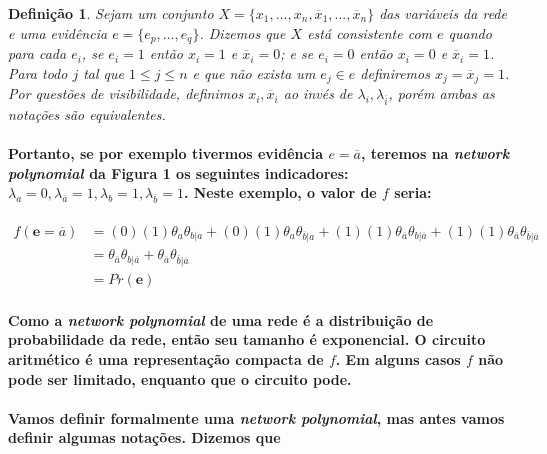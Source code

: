 \documentclass[a4paper,10pt]{article}
\theoremstyle{plain}
\newtheorem*{spn-def}{Definição}
\begin{document}
\begin{spn-def} Sejam um conjunto $X=\{x_1,...,x_n,\overline{x}_1,...,\overline{x}_n\}$ das 
variáveis da rede e uma evidência $e=\{e_p,...,e_q\}$. Dizemos que $X$ está consistente com $e$ 
quando para cada $e_i$, se $e_i=1$ então $x_i=1$ e $\overline{x}_i=0$; e se $e_i=0$ então $x_i=0$ 
e $\overline{x}_i=1$. Para todo $j$ tal que $1\leq{j}\leq{n}$ e que não exista um $e_j \in e$
definiremos $x_j=\overline{x}_j=1$. Por questões de visibilidade, definimos $x_i, \overline{x}_i$
ao invés de $\lambda_{i}, \lambda_{\overline{i}}$, porém ambas as notações são equivalentes.
\end{spn-def}

\paragraph{
  Portanto, se por exemplo tivermos evidência $e=\overline{a}$, teremos na \textit{network 
polynomial} da Figura 1 os seguintes indicadores: $\lambda_{a}=0, \lambda_{\overline{a}}=1,
\lambda_{b}=1, \lambda_{\overline{b}}=1$. Neste exemplo, o valor de $f$ seria:
}

\begin{equation}
\begin{split}
f(\textbf{e}=\overline{a}) & = (0)(1)\theta_{a}\theta_{b|a} + (0)(1)\theta_{a}\theta_{\overline{b}|a} +
  (1)(1)\theta_{\overline{a}}\theta_{b|\overline{a}} + 
  (1)(1)\theta_{\overline{a}}\theta_{\overline{b}|\overline{a}} \\
& = \theta_{\overline{a}}\theta_{b|\overline{a}} + \theta_{\overline{a}}\theta_{\overline{b}|\overline{a}} \\
& = Pr(\textbf{e})
\end{split}
\end{equation}

\paragraph{
  Como a \textit{network polynomial} de uma rede é a distribuição de probabilidade da rede, então
seu tamanho é exponencial. O circuito aritmético é uma representação compacta de $f$. Em alguns
casos $f$ não pode ser limitado, enquanto que o circuito pode.
}

\paragraph{
  Vamos definir formalmente uma \textit{network polynomial}, mas antes vamos definir algumas
notações. Dizemos que $$
}

\newpage

\printbibliography
\end{document}
